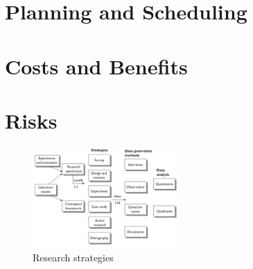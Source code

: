 \documentclass[11pt, a4paper]{article}
\begin{document}
\section{Planning and Scheduling}

\section{Costs and Benefits}

\section{Risks}

\begin{figure}[h]
    \center
    \includegraphics[width=0.5\textwidth]{research-strategies.png}
    \caption{Research strategies \cite{oates2005researching}}
    \label{fig:research_strategies}
\end{figure}

\printbibliography 
\pagebreak

\end{document}
